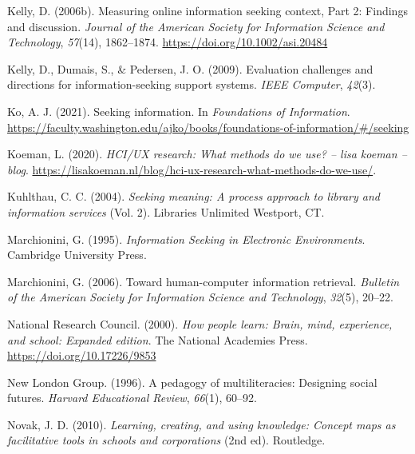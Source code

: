 \documentclass[a4paper, nobind]{templates/ociamthesis}
\newlength{\cslhangindent}
\newenvironment{CSLReferences}[2] %
 {%
  \setlength{\parindent}{0pt}
  \ifodd #1
  \let\oldpar\par
  \def\par{\hangindent=\cslhangindent\oldpar}
  \fi
  \setlength{\parskip}{1mm}
  \setlength{\baselineskip}{6mm}
 }%
 {}
\begin{document}
\begin{CSLReferences}{1}{0}
\leavevmode{}%
Kelly, D. (2006b). Measuring online information seeking context, {Part} 2: Findings and discussion. \emph{Journal of the American Society for Information Science and Technology}, \emph{57}(14), 1862--1874. \url{https://doi.org/10.1002/asi.20484}

\leavevmode{}%
Kelly, D., Dumais, S., \& Pedersen, J. O. (2009). Evaluation challenges and directions for information-seeking support systems. \emph{IEEE Computer}, \emph{42}(3).

\leavevmode{}%
Ko, A. J. (2021). Seeking information. In \emph{Foundations of {Information}}. \url{https://faculty.washington.edu/ajko/books/foundations-of-information/\#/seeking}

\leavevmode{}%
Koeman, L. (2020). \emph{HCI/UX research: What methods do we use? -- lisa koeman -- blog}. \url{https://lisakoeman.nl/blog/hci-ux-research-what-methods-do-we-use/}.

\leavevmode{}%
Kuhlthau, C. C. (2004). \emph{Seeking meaning: A process approach to library and information services} (Vol. 2). Libraries Unlimited Westport, CT.

\leavevmode{}%
Marchionini, G. (1995). \emph{Information {Seeking} in {Electronic Environments}}. {Cambridge University Press}.

\leavevmode{}%
Marchionini, G. (2006). Toward human-computer information retrieval. \emph{Bulletin of the American Society for Information Science and Technology}, \emph{32}(5), 20--22.

\leavevmode{}%
National Research Council. (2000). \emph{How people learn: {Brain}, mind, experience, and school: {Expanded} edition}. {The National Academies Press}. \url{https://doi.org/10.17226/9853}

\leavevmode{}%
New London Group. (1996). A pedagogy of multiliteracies: Designing social futures. \emph{Harvard Educational Review}, \emph{66}(1), 60--92.

\leavevmode{}%
Novak, J. D. (2010). \emph{Learning, creating, and using knowledge: Concept maps as facilitative tools in schools and corporations} (2nd ed). {Routledge}.


\end{CSLReferences}
\end{document}
